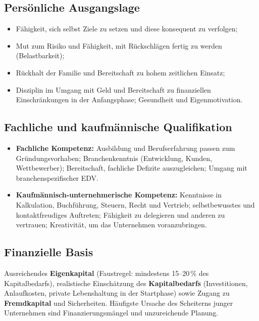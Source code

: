 \documentclass[11pt, a4paper]{article}
\begin{document}
\subsection{Persönliche Ausgangslage}

\begin{itemize}
  \item Fähigkeit, sich selbst Ziele zu setzen und diese konsequent zu verfolgen;
  \item Mut zum Risiko und Fähigkeit, mit Rückschlägen fertig zu werden (Belastbarkeit);
  \item Rückhalt der Familie und Bereitschaft zu hohem zeitlichen Einsatz;
  \item Disziplin im Umgang mit Geld und Bereitschaft zu finanziellen Einschränkungen
    in der Anfangsphase; Gesundheit und Eigenmotivation.
\end{itemize}

\subsection{Fachliche und kaufmännische Qualifikation}

\begin{itemize}
  \item \textbf{Fachliche Kompetenz:} Ausbildung und Berufserfahrung passen zum
    Gründungsvorhaben; Branchenkenntnis (Entwicklung, Kunden, Wettbewerber); Bereitschaft,
    fachliche Defizite auszugleichen; Umgang mit branchenspezifischer EDV.
  \item \textbf{Kaufmännisch-unternehmerische Kompetenz:} Kenntnisse in Kalkulation,
    Buchführung, Steuern, Recht und Vertrieb; selbstbewusstes und kontaktfreudiges
    Auftreten; Fähigkeit zu delegieren und anderen zu vertrauen; Kreativität, um das
    Unternehmen voranzubringen.
\end{itemize}

\subsection{Finanzielle Basis}

Ausreichendes \textbf{Eigenkapital} (Faustregel: mindestens 15--20\,\% des
Kapitalbedarfs), realistische Einschätzung des \textbf{Kapitalbedarfs} (Investitionen,
Anlaufkosten, private Lebenshaltung in der Startphase) sowie Zugang zu
\textbf{Fremdkapital} und Sicherheiten. Häufigste Ursache des Scheiterns junger
Unternehmen sind Finanzierungsmängel und unzureichende Planung.
\end{document}
